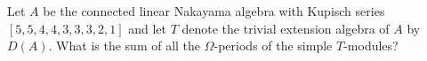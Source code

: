 Let $A$ be the connected linear Nakayama algebra with Kupisch series $[ 5, 5, 4, 4, 3, 3, 3, 2, 1 ]$ and let $T$ denote the trivial extension algebra of $A$ by $D(A)$. What is the sum of all the $\Omega$-periods of the simple $T$-modules?
